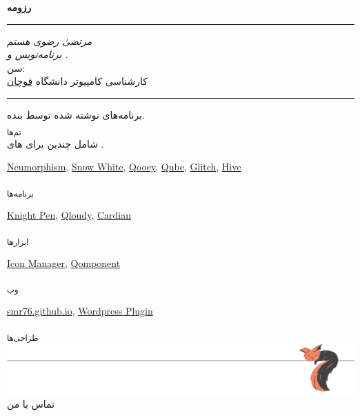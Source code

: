 	\noindent
	\begin{center}


	\textbf{رزومه}
	\noindent\textcolor{gray}{\rule{\linewidth}{0.5pt}}
	\textit{
	مرتضیٰ رضوی هستم}\\
	\textit{
	برنامه‌نویس
	 و .}\\[8mm]
	سن:
	\myage\smallskip\\
	کارشناسی کامپیوتر دانشگاه
	\href{https://en.wikipedia.org/wiki/Quchan\_University\_of\_Advanced\_Technologies\_Engineering}
	{قوچان}\\
	\noindent\textcolor{gray}{\rule{\linewidth}{0.5pt}}
	برنامه‌های نوشته شده توسط بنده.\\
	\textsubscript{تم‌ها}\\
	شامل چندین
	برای
	های
	.
	\begin{latin}
		\centering
		\href{https://github.com/SMR76/qml-neumorphism}{Neumorphism},
		\href{https://github.com/SMR76/qml-snow-white}{Snow White},
		\href{https://github.com/SMR76/qooey}{Qooey},
		\href{https://github.com/SMR76/qube}{Qube},
		\href{https://github.com/SMR76/glitch}{Glitch},
		\href{https://github.com/SMR76/hive}{Hive}
	\end{latin}
	\vspace{5mm}
	\textsubscript{برنامه‌ها}
	\begin{latin}
		\href{https://github.com/SMR76/knight-pen}{Knight Pen},
		\href{https://github.com/SMR76/cardian}{Qloudy},
		\href{https://github.com/SMR76/cardian}{Cardian}
	\end{latin}
	\textsubscript{ابزارها}
	\begin{latin}
		\centering
		\href{https://github.com/SMR76/icon-manager}{Icon Manager},
		\href{https://github.com/SMR76/qomponent}{Qomponent}
	\end{latin}
	\vspace{5mm}
	\textsubscript{وب}
	\begin{latin}
		\centering
		\href{https://smr76.github.io}{smr76.github.io},
		\href{https://github.com/SMR76/smr-wp-plugin}{Wordpress Plugin}
	\end{latin}
	\vspace{5mm}
	\textsubscript{طراحی‌ها}\\
	\href{https://www.instagram.com/one.red.little.fish}{}
	\includegraphics[width=\linewidth]{./sleeping-fox.pdf}\vspace*{-10mm}
	تماس با من
	\end{center}

